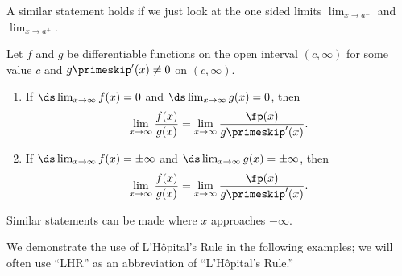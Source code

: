 A similar statement holds if we just look at the one sided limits $\lim_{x\to a^-}$ and $\lim_{x\to a^+}$.

{Let $f$ and $g$ be differentiable functions on the open interval $(c,\infty)$ for some value $c$ and $g\primeskip'(x)\neq0$ on $(c,\infty)$.
\begin{enumerate}
\item If $\ds\lim_{x\to\infty}f(x)=0$ and $\ds\lim_{x\to \infty}g(x)=0$, then
\[\lim_{x\to\infty}\frac{f(x)}{g(x)}=\lim_{x\to\infty}\frac{\fp(x)}{g\primeskip'(x)}.\]
\item If  $\ds\lim_{x\to \infty}f(x)=\pm\infty$ and $\ds\lim_{x\to \infty}g(x)=\pm\infty$, then
\[\lim_{x\to\infty}\frac{f(x)}{g(x)}=\lim_{x\to\infty}\frac{\fp(x)}{g\primeskip'(x)}.\]
\end{enumerate}
Similar statements can be made where $x$ approaches $-\infty$.}

We demonstrate the use of L'H\^opital's Rule in the following examples; we will often use ``LHR'' as an abbreviation of ``L'H\^opital's Rule.''

